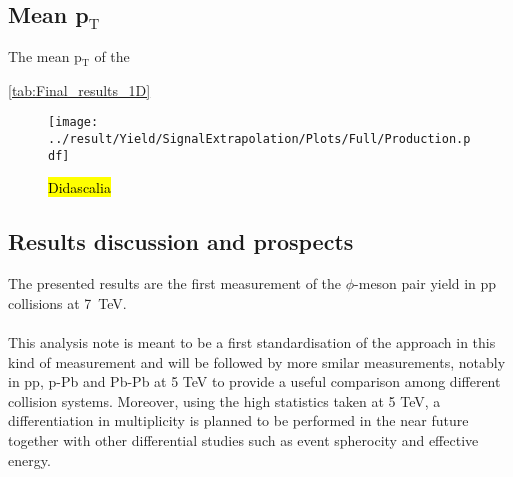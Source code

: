\subsection{Mean p$_{\text{T}}$}
The mean p$_{\text{T}}$ of the 

\ref{tab:Final_results_1D}

\begin{figure}
	\centering
		\texttt{[image: ../result/Yield/SignalExtrapolation/Plots/Full/Production.pdf]}
	\caption{\hl{Didascalia}}
	\label{fig:Production}
\end{figure}

\subsection{Results discussion and prospects}
The presented results are the first measurement of the $\phi$-meson pair yield in pp collisions at \SI{7}{\tera\electronvolt}.\\
\indent \\
\indent This analysis note is meant to be a first standardisation of the approach in this kind of measurement and will be followed by more smilar measurements, notably in pp, p-Pb and Pb-Pb at 5 TeV to provide a useful comparison among different collision systems. Moreover, using the high statistics taken at 5 TeV, a differentiation in multiplicity is planned to be performed in the near future together with other differential studies such as event spherocity and effective energy.

